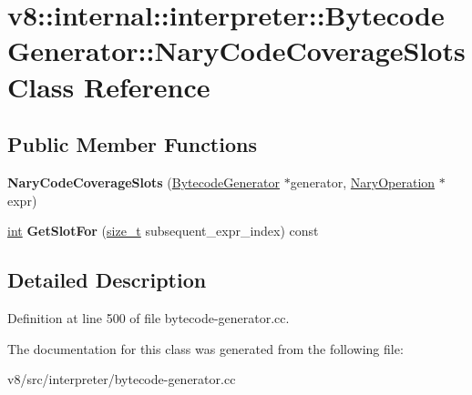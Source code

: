 \hypertarget{classv8_1_1internal_1_1interpreter_1_1BytecodeGenerator_1_1NaryCodeCoverageSlots}{}\section{v8\+:\+:internal\+:\+:interpreter\+:\+:Bytecode\+Generator\+:\+:Nary\+Code\+Coverage\+Slots Class Reference}
\label{classv8_1_1internal_1_1interpreter_1_1BytecodeGenerator_1_1NaryCodeCoverageSlots}
\subsection*{Public Member Functions}
\begin{DoxyCompactItemize}
\item 
\mbox{\label{classv8_1_1internal_1_1interpreter_1_1BytecodeGenerator_1_1NaryCodeCoverageSlots_a6ab3d43cae608519ed9e08c4f36c20c9}} 
{\bfseries Nary\+Code\+Coverage\+Slots} (\mbox{\hyperlink{classv8_1_1internal_1_1interpreter_1_1BytecodeGenerator}{Bytecode\+Generator}} $\ast$generator, \mbox{\hyperlink{classv8_1_1internal_1_1NaryOperation}{Nary\+Operation}} $\ast$expr)
\item 
\mbox{\label{classv8_1_1internal_1_1interpreter_1_1BytecodeGenerator_1_1NaryCodeCoverageSlots_a098fc665a8b546a299b277151a56cb59}} 
\mbox{\hyperlink{classint}{int}} {\bfseries Get\+Slot\+For} (\mbox{\hyperlink{classsize__t}{size\+\_\+t}} subsequent\+\_\+expr\+\_\+index) const
\end{DoxyCompactItemize}


\subsection{Detailed Description}


Definition at line 500 of file bytecode-\/generator.\+cc.



The documentation for this class was generated from the following file\+:\begin{DoxyCompactItemize}
\item 
v8/src/interpreter/bytecode-\/generator.\+cc\end{DoxyCompactItemize}
